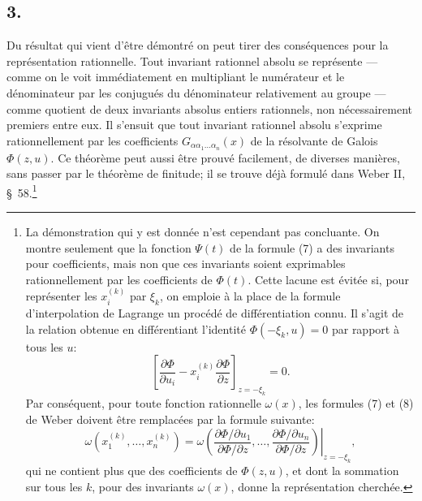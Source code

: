 \subsection*{3.}
Du résultat qui vient d'être démontré on peut tirer des conséquences pour la représentation rationnelle. Tout invariant rationnel absolu se représente --- comme on le voit immédiatement en multipliant le numérateur et le dénominateur par les conjugués du dénominateur relativement au groupe --- comme quotient de deux invariants absolus entiers rationnels, non nécessairement premiers entre eux. Il s'ensuit que tout invariant rationnel absolu s'exprime rationnellement par les coefficients $G_{\alpha\alpha_1\ldots\alpha_n}(x)$ de la résolvante de Galois $\Phi(z,u)$. Ce théorème peut aussi être prouvé facilement, de diverses manières, sans passer par le théorème de finitude; il se trouve déjà formulé dans Weber II, \S\ 58.\footnote{La démonstration qui y est donnée n'est cependant pas concluante. On montre seulement que la fonction $\Psi(t)$ de la formule (7) a des invariants pour coefficients, mais non que ces invariants soient exprimables rationnellement par les coefficients de $\Phi(t)$. Cette lacune est évitée si, pour représenter les $x_i^{(k)}$ par $\xi_k$, on emploie à la place de la formule d'interpolation de Lagrange un procédé de différentiation connu. Il s'agit de la relation obtenue en différentiant l'identité $\Phi(-\xi_k,u)=0$ par rapport à tous les $u$:
\[
 \left[\frac{\partial\Phi}{\partial u_i}
      -x_i^{(k)}\frac{\partial\Phi}{\partial z}\right]_{z=-\xi_k}=0.
\]
Par conséquent, pour toute fonction rationnelle $\omega(x)$, les formules (7) et (8) de Weber doivent être remplacées par la formule suivante:
\[
 \omega(x_1^{(k)},\ldots,x_n^{(k)})=
 \left.
 \omega\!\left(
   \frac{\partial\Phi/\partial u_1}{\partial\Phi/\partial z},\ldots,
   \frac{\partial\Phi/\partial u_n}{\partial\Phi/\partial z}
 \right)\right|_{z=-\xi_k},
\]
qui ne contient plus que des coefficients de $\Phi(z,u)$, et dont la sommation sur tous les $k$, pour des invariants $\omega(x)$, donne la représentation cherchée.}

